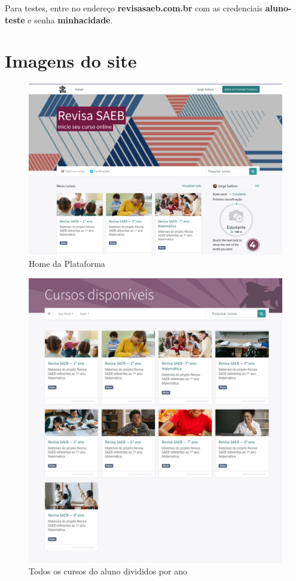 Para testes, entre no endereço \textbf{revisasaeb.com.br} com 
as credenciais \textbf{aluno-teste} e senha \textbf{minhacidade}. 


 

\chapter{Imagens do site}

\begin{figure}
\includegraphics[width=\textwidth]{imgs/front}
\caption{Home da Plataforma}
\end{figure}



\begin{figure}
\includegraphics[width=\textwidth]{imgs/cursos}
\caption{Todos os cursos do aluno divididos por ano}
\end{figure}


